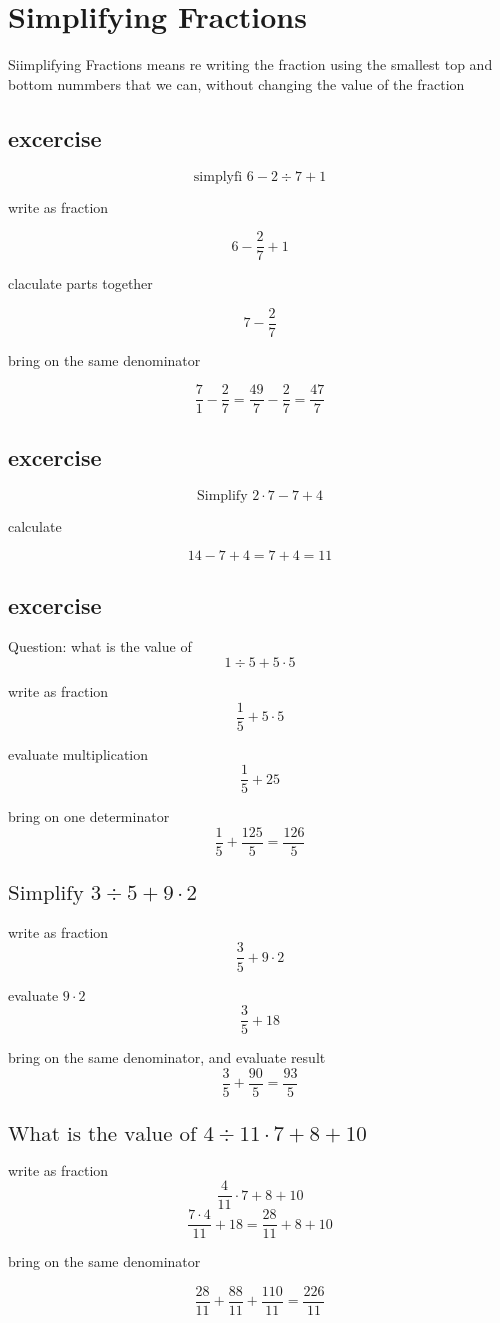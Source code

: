 \documentclass[12pt]{article}
\begin{document}
\section{Simplifying Fractions}


Siimplifying Fractions means re writing the fraction using the 
smallest top and bottom nummbers that we can, without changing the value of 
the fraction 

\subsection{excercise}
$$ \text{simplyfi } 6 - 2 \div 7 + 1 $$

write as fraction

$$ 6- \frac{2}{7} +1 $$

claculate parts together

$$ 7 - \frac{2}{7} $$

bring on the same denominator

$$ \frac{7}{1} - \frac{2}{7} = \frac{49}{7} - \frac{2}{7} = \frac{47}{7} $$

\subsection{excercise}

$$ \text{Simplify } 2 \cdot 7 - 7 + 4 $$

calculate

$$ 14 -7 + 4 = 7+4 = 11 $$

\subsection{excercise}

Question: what is the value of
$$ 1 \div 5 + 5 \cdot 5 $$

write as fraction
$$ \frac{1}{5} + 5 \cdot 5 $$

evaluate multiplication
$$ \frac{1}{5} + 25 $$

bring on one determinator
$$ \frac{1}{5} + \frac{125}{5} = \frac{126}{5}$$

\subsection{$ \text{Simplify } 3 \div 5 + 9 \cdot 2 $}

write as fraction
$$ \frac{3}{5} + 9 \cdot 2 $$

evaluate $ 9 \cdot 2 $
$$ \frac{3}{5} + 18 $$

bring on the same denominator, and evaluate result
$$ \frac{3}{5} + \frac{90}{5}  = \frac{93}{5}$$


\subsection{$  \text{What is the value of } 4 \div 11 \cdot 7 + 8 + 10 $}

write as fraction 
$$ \frac{4}{11} \cdot 7 + 8 + 10 $$
$$ \frac{7 \cdot 4}{11} +18 = \frac{28}{11} + 8 + 10 $$ 

bring on the same denominator

$$ \frac{28}{11} + \frac{88}{11} + \frac{110}{11}  = \frac{226}{11} $$
\end{document}
